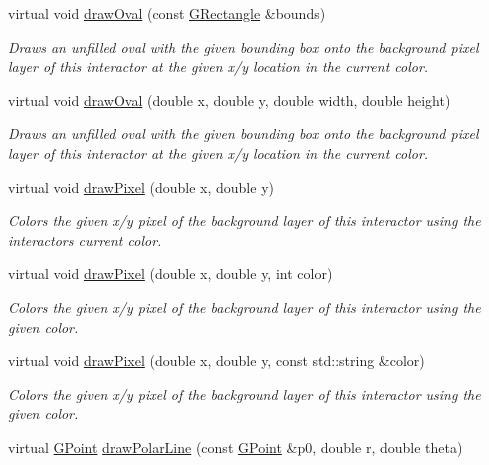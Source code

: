 \begin{DoxyCompactItemize}
virtual void \mbox{\hyperlink{classGDrawingSurface_a8adc13027efe311b4a6a715205b8bc46}{draw\+Oval}} (const \mbox{\hyperlink{classGRectangle}{G\+Rectangle}} \&bounds)
\begin{DoxyCompactList}\small\item\em Draws an unfilled oval with the given bounding box onto the background pixel layer of this interactor at the given x/y location in the current color. \end{DoxyCompactList}\item 
virtual void \mbox{\hyperlink{classGDrawingSurface_aa5b1cf902e578907da3c63060686354e}{draw\+Oval}} (double x, double y, double width, double height)
\begin{DoxyCompactList}\small\item\em Draws an unfilled oval with the given bounding box onto the background pixel layer of this interactor at the given x/y location in the current color. \end{DoxyCompactList}\item 
virtual void \mbox{\hyperlink{classGDrawingSurface_a0c1e2923d8d163d62d0896d8c5cfa191}{draw\+Pixel}} (double x, double y)
\begin{DoxyCompactList}\small\item\em Colors the given x/y pixel of the background layer of this interactor using the interactor\textquotesingle{}s current color. \end{DoxyCompactList}\item 
virtual void \mbox{\hyperlink{classGDrawingSurface_a3a64eb6383e601be8438e9c71643c432}{draw\+Pixel}} (double x, double y, int color)
\begin{DoxyCompactList}\small\item\em Colors the given x/y pixel of the background layer of this interactor using the given color. \end{DoxyCompactList}\item 
virtual void \mbox{\hyperlink{classGDrawingSurface_a20abc26a94b7eb310e34abf668e0f5f4}{draw\+Pixel}} (double x, double y, const std\+::string \&color)
\begin{DoxyCompactList}\small\item\em Colors the given x/y pixel of the background layer of this interactor using the given color. \end{DoxyCompactList}\item 
virtual \mbox{\hyperlink{classGPoint}{G\+Point}} \mbox{\hyperlink{classGDrawingSurface_af70cce1e4f708f1ed5b6f29cecb660e7}{draw\+Polar\+Line}} (const \mbox{\hyperlink{classGPoint}{G\+Point}} \&p0, double r, double theta)

\end{DoxyCompactItemize}

